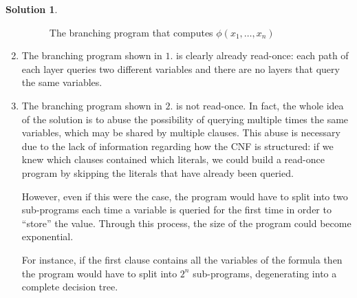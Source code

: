 \documentclass[12pt,a4paper]{report}
\theoremstyle{definition}
\newtheorem{solution}{Solution}
\newcommand{\curlyquotes}[1]{\textquotedblleft #1\textquotedblright}
\begin{document}
\begin{solution}
\begin{enumerate}
\begin{figure}[H]
{
                }

                \caption{The branching program that computes $\phi(x_1, \ldots, x_n)$}
                \label{bp_2}
            \end{figure}

            \item The branching program shown in $1.$ is clearly already read-once: each path of each layer queries two different variables and there are no layers that query the same variables.
            
            \item The branching program shown in $2.$ is not read-once. In fact, the whole idea of the solution is to abuse the possibility of querying multiple times the same variables, which may be shared by multiple clauses. This abuse is necessary due to the lack of information regarding how the CNF is structured: if we knew which clauses contained which literals, we could build a read-once program by skipping the literals that have already been queried.
            
            However, even if this were the case, the program would have to split into two sub-programs each time a variable is queried for the first time in order to \curlyquotes{store} the value. Through this process, the size of the program could become exponential.
            
            For instance, if the first clause contains all the variables of the formula then the program would have to split into $2^n$ sub-programs, degenerating into a complete decision tree. 
        \end{enumerate}
    \end{solution}


    \printbibliography
\end{document}
